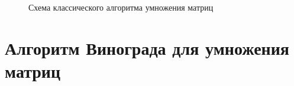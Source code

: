 \newpage

\begin{figure}[ph!]
	\caption{Схема классического алгоритма умножения матриц}
\end{figure}

\section{Алгоритм Винограда для умножения матриц}

